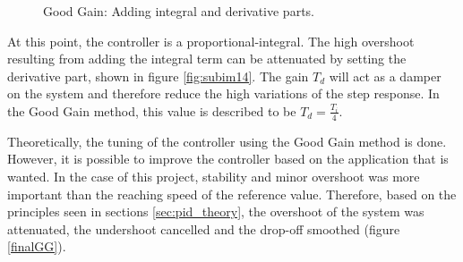 \begin{figure}[H]
\hfill
{}
\hfill
{}
\hfill

\caption{Good Gain: Adding integral and derivative parts.}
\end{figure}

At this point, the controller is a proportional-integral. The high overshoot resulting from adding the integral term can be attenuated by setting the derivative part, shown in figure \ref{fig:subim14}. The gain $T_d$ will act as a damper on the system and therefore reduce the high variations of the step response. In the Good Gain method, this value is described to be $T_d = \frac{T_i}{4}$.

\vspace{5mm}

Theoretically, the tuning of the controller using the Good Gain method is done. However, it is possible to improve the controller based on the application that is wanted. In the case of this project, stability and minor overshoot was more important than the reaching speed of the reference value. Therefore, based on the principles seen in sections \ref{sec:pid_theory}, the overshoot of the system was attenuated, the undershoot cancelled and the drop-off smoothed (figure \ref{finalGG}).

